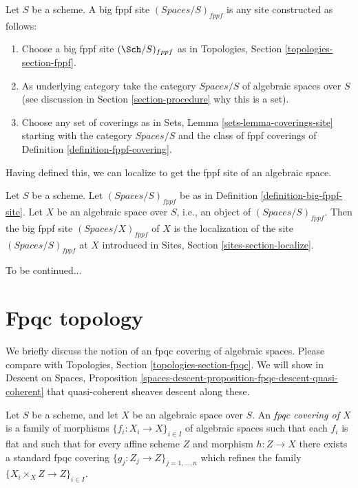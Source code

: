 \begin{definition}
\label{definition-big-fppf-site}
Let $S$ be a scheme. A big fppf site {\it $(\textit{Spaces}/S)_{fppf}$}
is any site constructed as follows:
\begin{enumerate}
\item Choose a big fppf site $(\Sch/S)_{fppf}$ as in
Topologies, Section \ref{topologies-section-fppf}.
\item As underlying category take the category $\textit{Spaces}/S$
of algebraic spaces over $S$ (see discussion in
Section \ref{section-procedure} why this is a set).
\item Choose any set of coverings as in
Sets, Lemma \ref{sets-lemma-coverings-site} starting with the
category $\textit{Spaces}/S$ and the class of fppf coverings
of Definition \ref{definition-fppf-covering}.
\end{enumerate}
\end{definition}

\noindent
Having defined this, we can localize to get the fppf
site of an algebraic space.

\begin{definition}
\label{definition-big-small-fppf}
Let $S$ be a scheme. Let $(\textit{Spaces}/S)_{fppf}$ be as in
Definition \ref{definition-big-fppf-site}.
Let $X$ be an algebraic space over $S$, i.e., an object of
$(\textit{Spaces}/S)_{fppf}$. Then the big fppf site
{\it $(\textit{Spaces}/X)_{fppf}$} of $X$
is the localization of the site $(\textit{Spaces}/S)_{fppf}$
at $X$ introduced in Sites, Section \ref{sites-section-localize}.
\end{definition}

\noindent
To be continued...





\section{Fpqc topology}
\label{section-fpqc}

\noindent
We briefly discuss the notion of an fpqc covering of algebraic spaces.
Please compare with
Topologies, Section \ref{topologies-section-fpqc}.
We will show in
Descent on Spaces,
Proposition \ref{spaces-descent-proposition-fpqc-descent-quasi-coherent}
that quasi-coherent sheaves descent along these.

\begin{definition}
\label{definition-fpqc-covering}
Let $S$ be a scheme, and let $X$ be an algebraic space over $S$.
An {\it fpqc covering of $X$} is a family of morphisms
$\{f_i : X_i \to X\}_{i \in I}$ of algebraic spaces
such that each $f_i$ is flat and such that for every affine scheme
$Z$ and morphism $h : Z \to X$ there exists a standard fpqc covering
$\{g_j : Z_j \to Z\}_{j = 1, \ldots, n}$ which refines the family
$\{X_i \times_X Z \to Z\}_{i \in I}$.
\end{definition}

